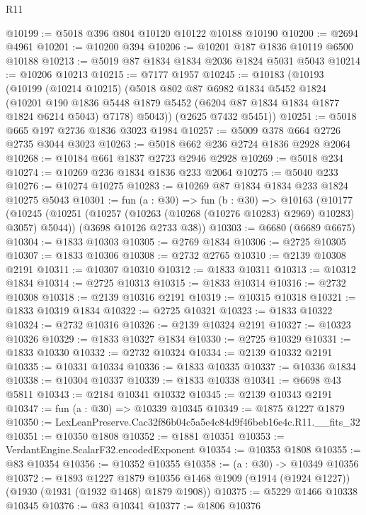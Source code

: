 \begin{lexlean}{R11}
\begin{coremodule}
@10199 := @5018 @396 @804 @10120 @10122 @10188 @10190
@10200 := @2694 @4961
@10201 := @10200 @394
@10206 := @10201 @187 @1836 @10119 @6500 @10188
@10213 := @5019 @87 @1834 @1834 @2036 @1824 @5031 @5043
@10214 := @10206 @10213
@10215 := @7177 @1957
@10245 := @10183
    (@10193
      (@10199
        (@10214 @10215)
        (@5018
          @802
          @87
          @6982
          @1834
          @5452
          @1824
          (@10201
            @190
            @1836
            @5448
            @1879
            @5452
            (@6204 @87 @1834 @1834 @1877 @1824 @6214 @5043)
            @7178)
          @5043))
      (@2625 @7432 @5451))
@10251 := @5018 @665 @197 @2736 @1836 @3023 @1984
@10257 := @5009 @378 @664 @2726 @2735 @3044 @3023
@10263 := @5018 @662 @236 @2724 @1836 @2928 @2064
@10268 := @10184 @661 @1837 @2723 @2946 @2928
@10269 := @5018 @234
@10274 := @10269 @236 @1834 @1836 @233 @2064
@10275 := @5040 @233
@10276 := @10274 @10275
@10283 := @10269 @87 @1834 @1834 @233 @1824 @10275 @5043
@10301 := fun (a : @30) =>
  fun (b : @30) =>
  @10163
    (@10177
      (@10245 (@10251 (@10257 (@10263 (@10268 (@10276 @10283) @2969) @10283) @3057) @5044))
      (@3698 @10126 @2733 @38))
@10303 := @6680 (@6689 @6675)
@10304 := @1833 @10303
@10305 := @2769 @1834
@10306 := @2725 @10305
@10307 := @1833 @10306
@10308 := @2732 @2765
@10310 := @2139 @10308 @2191
@10311 := @10307 @10310
@10312 := @1833 @10311
@10313 := @10312 @1834
@10314 := @2725 @10313
@10315 := @1833 @10314
@10316 := @2732 @10308
@10318 := @2139 @10316 @2191
@10319 := @10315 @10318
@10321 := @1833 @10319 @1834
@10322 := @2725 @10321
@10323 := @1833 @10322
@10324 := @2732 @10316
@10326 := @2139 @10324 @2191
@10327 := @10323 @10326
@10329 := @1833 @10327 @1834
@10330 := @2725 @10329
@10331 := @1833 @10330
@10332 := @2732 @10324
@10334 := @2139 @10332 @2191
@10335 := @10331 @10334
@10336 := @1833 @10335
@10337 := @10336 @1834
@10338 := @10304 @10337
@10339 := @1833 @10338
@10341 := @6698 @43 @5811
@10343 := @2184 @10341 @10332
@10345 := @2139 @10343 @2191
@10347 := fun (a : @30) => @10339 @10345
@10349 := @1875 @1227 @1879
@10350 := LexLeanPreserve.Cac32f86b04c5a5e4c84d9f46beb16e4c.R11.__fits_32
@10351 := @10350 @1808
@10352 := @1881 @10351
@10353 := VerdantEngine.ScalarF32.encodedExponent
@10354 := @10353 @1808
@10355 := @83 @10354
@10356 := @10352 @10355
@10358 := (a : @30) -> @10349 @10356
@10372 := @1893
    @1227
    @1879
    @10356
    @1468
    @1909
    (@1914 (@1924 @1227))
    (@1930 (@1931 (@1932 @1468) @1879 @1908))
@10375 := @5229 @1466 @10338 @10345
@10376 := @83 @10341
@10377 := @1806 @10376

\end{coremodule}
\end{lexlean}
